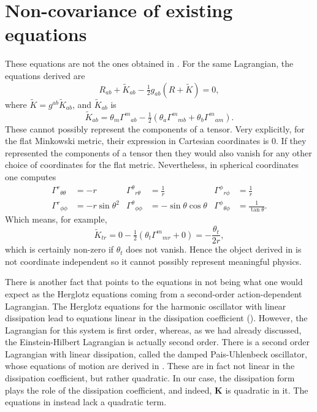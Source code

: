 \documentclass[../main.tex]{subfiles}
\begin{document}
\section{Non-covariance of existing equations}
These equations are not the ones obtained in \cite{Lazo2017}. For the same Lagrangian, the
equations derived are
\begin{equation} \label{eq:EFE lazo}
	R_{ab} + \tilde{K}_{ab} - \tfrac{1}{2}g_{ab}(R + \tilde{K}) = 0,
\end{equation}
where $\tilde{K}=g^{ab}\tilde{K}_{ab}$, and $\tilde{K}_{ab}$ is 
\begin{equation} \label{eq:}
	\tilde{K}_{ab} = \theta_m {\Gamma^m}_{ab} - \tfrac{1}{2}\left(\theta_a {\Gamma^m}_{mb} +
	\theta_b {\Gamma^m}_{am}\right). 
\end{equation}
These cannot possibly represent the components of a tensor. Very explicitly,  for the flat Minkowski metric, their
expression in Cartesian coordinates is 0. If they represented the components of a tensor then they would also vanish for any other choice of coordinates for the flat metric. Nevertheless, in spherical coordinates one computes
\begin{align*}
	{\Gamma^r}_{\theta\theta} & = -r & {\Gamma^\theta}_{r\theta} & = \frac{1}{r} &
	{\Gamma^\phi}_{r\phi} & = \frac{1}{r} \\
	{\Gamma^r}_{\phi\phi} & = -r \sin{\theta}^2 & {\Gamma^\theta}_{\phi\phi} & =
	-\sin{\theta}\cos{\theta} & {\Gamma^\phi}_{\theta\phi} & = \frac{1}{\tan{\theta}}. 
\end{align*}
Which means, for example,
\begin{equation*}
	\tilde{K}_{tr} = 0 - \tfrac{1}{2}(\theta_t {\Gamma^m}_{mr} + 0) =
	-\frac{\theta_t}{2r},
\end{equation*}
which is certainly non-zero if \( \theta_t \) does not vanish. Hence the object derived in \cite{Lazo2017} is not coordinate independent so it
cannot possibly represent meaningful physics. 

There is another fact that points to the equations in \cite{Lazo2017} not being what one would expect as the Herglotz equations coming from a second-order action-dependent Lagrangian. The Herglotz equations for the harmonic oscillator with
linear dissipation lead to equations linear in the dissipation coefficient (\cite{Gaset2020b}). However, the Lagrangian for this system is first
order, whereas, as we had already discussed, the Einstein-Hilbert Lagrangian is actually
second order. There is a second order Lagrangian with linear
dissipation, called the damped Pais-Uhlenbeck oscillator, whose equations of motion are derived in \cite{Leon2021a}. These are in fact not linear in the dissipation coefficient, but rather quadratic. In
our case, the dissipation form plays the role of the dissipation coefficient, and indeed, \(\mathbf{K}\) is quadratic in it. The equations in \cite{Lazo2017} instead lack a quadratic term.
\end{document}
